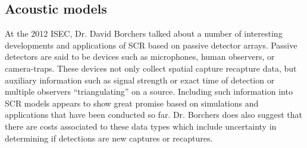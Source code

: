 \subsection{Acoustic models}
At the 2012 ISEC, Dr. David Borchers talked about a number of interesting 
developments and applications of SCR based on passive detector 
arrays. Passive detectors are said to be devices such as microphones,
human observers, or camera-traps.  These devices not only collect spatial
capture recapture data, but auxiliary information such as signal strength or 
exact time of detection or multiple observers ``triangulating'' on a source. 
 Including such information into SCR models appears to 
show great promise based on simulations and applications that have been conducted 
so far.  Dr. Borchers does also suggest that there are costs associated to these
data types which include uncertainty in determining if detections are new captures
or recaptures.  

